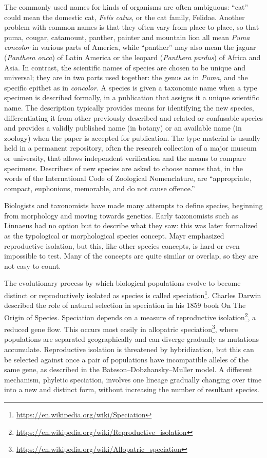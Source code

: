 \documentclass[]{book}
\let\rmarkdownfootnote\footnote%
\def\footnote{\protect\rmarkdownfootnote}
\renewcommand{\href}[2]{#2\footnote{\url{#1}}}
\theoremstyle{definition}
\theoremstyle{definition}
\theoremstyle{definition}
\theoremstyle{remark}
\begin{document}
The commonly used names for kinds of organisms are often ambiguous:
``cat'' could mean the domestic cat, \emph{Felis catus}, or the cat family,
Felidae. Another problem with common names is that they often vary from
place to place, so that puma, cougar, catamount, panther, painter and
mountain lion all mean \emph{Puma concolor} in various parts of America, while
``panther'' may also mean the jaguar (\emph{Panthera onca}) of Latin America or
the leopard (\emph{Panthera pardus}) of Africa and Asia. In contrast, the
scientific names of species are chosen to be unique and universal; they
are in two parts used together: the genus as in \emph{Puma}, and the specific
epithet as in \emph{concolor}. A species is given a taxonomic name when a type
specimen is described formally, in a publication that assigns it a
unique scientific name. The description typically provides means for
identifying the new species, differentiating it from other previously
described and related or confusable species and provides a validly
published name (in botany) or an available name (in zoology) when the
paper is accepted for publication. The type material is usually held in
a permanent repository, often the research collection of a major museum
or university, that allows independent verification and the means to
compare specimens. Describers of new species are asked to choose names
that, in the words of the International Code of Zoological Nomenclature,
are ``appropriate, compact, euphonious, memorable, and do not cause
offence.''

Biologists and taxonomists have made many attempts to define species,
beginning from morphology and moving towards genetics. Early taxonomists
such as Linnaeus had no option but to describe what they saw: this was
later formalized as the typological or morphological species concept.
Mayr emphasized reproductive isolation, but this, like other species
concepts, is hard or even impossible to test. Many of the concepts are
quite similar or overlap, so they are not easy to count.

The evolutionary process by which biological populations evolve to
become distinct or reproductively isolated as species is called
\href{https://en.wikipedia.org/wiki/Speciation}{speciation}. Charles Darwin described the role of natural selection in
speciation in his 1859 book On The Origin of Species. Speciation depends on
a measure of \href{https://en.wikipedia.org/wiki/Reproductive_isolation}{reproductive isolation}, a reduced gene flow. This occurs
most easily in \href{https://en.wikipedia.org/wiki/Allopatric_speciation}{allopatric speciation}, where populations are separated
geographically and can diverge gradually as mutations accumulate.
Reproductive isolation is threatened by hybridization, but this can be
selected against once a pair of populations have incompatible alleles of
the same gene, as described in the Bateson--Dobzhansky--Muller model. A
different mechanism, phyletic speciation, involves one lineage gradually
changing over time into a new and distinct form, without increasing the
number of resultant species.
\end{document}
